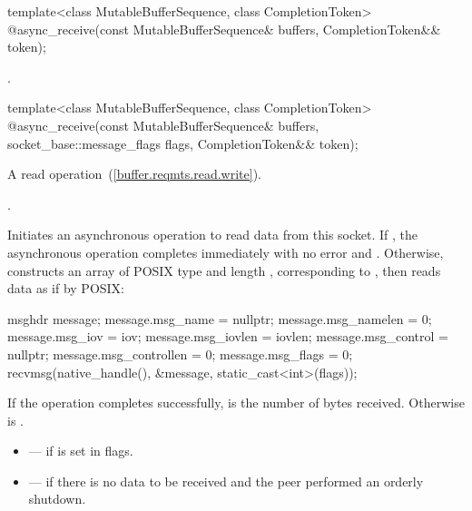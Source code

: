 \begin{itemdecl}
template<class MutableBufferSequence, class CompletionToken>
  @\DEDUCED@ async_receive(const MutableBufferSequence& buffers,
                        CompletionToken&& token);
\end{itemdecl}

\begin{itemdescr}
\pnum
\returns {}.
\end{itemdescr}

\begin{itemdecl}
template<class MutableBufferSequence, class CompletionToken>
  @\DEDUCED@ async_receive(const MutableBufferSequence& buffers,
                        socket_base::message_flags flags,
                        CompletionToken&& token);
\end{itemdecl}

\begin{itemdescr}
\pnum
A read operation~(\ref{buffer.reqmts.read.write}).

\pnum
\completionsig {}.

\pnum
\effects Initiates an asynchronous operation to read data from this socket. If , the asynchronous operation completes immediately with no error and . Otherwise, constructs an array  of POSIX type  and length , corresponding to , then reads data as if by POSIX: 
\begin{codeblock}
msghdr message;
message.msg_name = nullptr;
message.msg_namelen = 0;
message.msg_iov = iov;
message.msg_iovlen = iovlen;
message.msg_control = nullptr;
message.msg_controllen = 0;
message.msg_flags = 0;
recvmsg(native_handle(), &message, static_cast<int>(flags));
\end{codeblock}


\pnum
If the operation completes successfully,  is the number of bytes received. Otherwise  is .

\pnum
\errors
\begin{itemize}
\item
{} --- if  is set in flags.
\item
{} --- if there is no data to be received and the peer performed an orderly shutdown.
\end{itemize}
\end{itemdescr}

